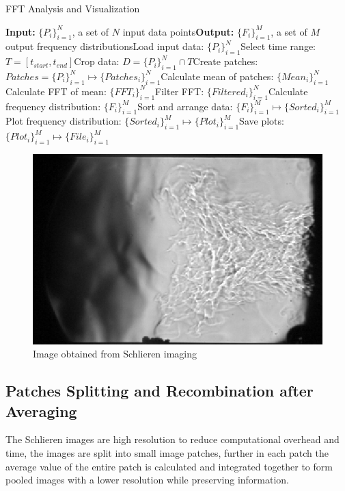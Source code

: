 \documentclass[conference]{IEEEtran}
\begin{document}
	\begin{algorithm}
		\caption{FFT Analysis and Visualization}
		\begin{algorithmic}[1]
			\State \textbf{Input:} $\{P_{i}\}_{i=1}^{N}$, a set of $N$ input data points\State \textbf{Output:} $\{F_{i}\}_{i=1}^{M}$, a set of $M$ output frequency distributions\State Load input data: $\{P_{i}\}_{i=1}^{N}$\State Select time range: $T = [t_{start}, t_{end}]$\State Crop data: $D = \{P_{i}\}_{i=1}^{N} \cap T$\EndProcedure{}\State Create patches: $Patches = \{P_{i}\}_{i=1}^{N} \mapsto \{Patches_{i}\}_{i=1}^{N}$\State Calculate mean of patches: $\{Mean_{i}\}_{i=1}^{N}$\EndProcedure{}\State Calculate FFT of mean: $\{FFT_{i}\}_{i=1}^{N}$\State Filter FFT: $\{Filtered_{i}\}_{i=1}^{N}$\EndProcedure{}\State Calculate frequency distribution: $\{F_{i}\}_{i=1}^{M}$\State Sort and arrange data: $\{F_{i}\}_{i=1}^{M} \mapsto \{Sorted_{i}\}_{i=1}^{M}$\EndProcedure{}\State Plot frequency distribution: $\{Sorted_{i}\}_{i=1}^{M} \mapsto \{Plot_{i}\}_{i=1}^{M}$\State Save plots: $\{Plot_{i}\}_{i=1}^{M} \mapsto \{File_{i}\}_{i=1}^{M}$\EndProcedure
		\end{algorithmic}
	\end{algorithm}
	
	\begin{figure}[H]
	\includegraphics[scale=.51]{plot/flame.png}
	\caption{Image obtained from Schlieren imaging}\label{fig:k2}
\end{figure}	


	
	\subsection{Patches Splitting and Recombination after Averaging}
	The Schlieren images are high resolution to reduce computational overhead and time, the images are split into small image patches, further in each patch the average value of the entire patch is calculated and integrated together to form pooled images with a lower resolution while preserving information.
	
\end{document}

